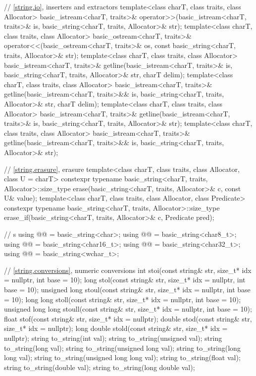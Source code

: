 \begin{codeblock}
{  // \ref{string.io}, inserters and extractors
  template<class charT, class traits, class Allocator>
    basic_istream<charT, traits>&
      operator>>(basic_istream<charT, traits>& is,
                 basic_string<charT, traits, Allocator>& str);
  template<class charT, class traits, class Allocator>
    basic_ostream<charT, traits>&
      operator<<(basic_ostream<charT, traits>& os,
                 const basic_string<charT, traits, Allocator>& str);
  template<class charT, class traits, class Allocator>
    basic_istream<charT, traits>&
      getline(basic_istream<charT, traits>& is,
              basic_string<charT, traits, Allocator>& str,
              charT delim);
  template<class charT, class traits, class Allocator>
    basic_istream<charT, traits>&
      getline(basic_istream<charT, traits>&& is,
              basic_string<charT, traits, Allocator>& str,
              charT delim);
  template<class charT, class traits, class Allocator>
    basic_istream<charT, traits>&
      getline(basic_istream<charT, traits>& is,
              basic_string<charT, traits, Allocator>& str);
  template<class charT, class traits, class Allocator>
    basic_istream<charT, traits>&
      getline(basic_istream<charT, traits>&& is,
              basic_string<charT, traits, Allocator>& str);

  // \ref{string.erasure}, erasure
  template<class charT, class traits, class Allocator, class U = charT>
    constexpr typename basic_string<charT, traits, Allocator>::size_type
      erase(basic_string<charT, traits, Allocator>& c, const U& value);
  template<class charT, class traits, class Allocator, class Predicate>
    constexpr typename basic_string<charT, traits, Allocator>::size_type
      erase_if(basic_string<charT, traits, Allocator>& c, Predicate pred);

  //  s
  using @@    = basic_string<char>;
  using @@  = basic_string<char8_t>;
  using @@ = basic_string<char16_t>;
  using @@ = basic_string<char32_t>;
  using @@   = basic_string<wchar_t>;

  // \ref{string.conversions}, numeric conversions
  int stoi(const string& str, size_t* idx = nullptr, int base = 10);
  long stol(const string& str, size_t* idx = nullptr, int base = 10);
  unsigned long stoul(const string& str, size_t* idx = nullptr, int base = 10);
  long long stoll(const string& str, size_t* idx = nullptr, int base = 10);
  unsigned long long stoull(const string& str, size_t* idx = nullptr, int base = 10);
  float stof(const string& str, size_t* idx = nullptr);
  double stod(const string& str, size_t* idx = nullptr);
  long double stold(const string& str, size_t* idx = nullptr);
  string to_string(int val);
  string to_string(unsigned val);
  string to_string(long val);
  string to_string(unsigned long val);
  string to_string(long long val);
  string to_string(unsigned long long val);
  string to_string(float val);
  string to_string(double val);
  string to_string(long double val);

}
\end{codeblock}
